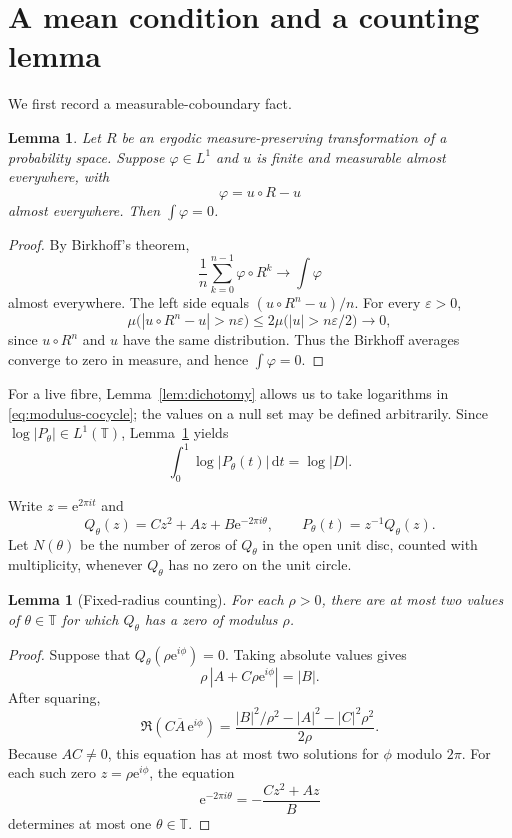 \documentclass[11pt]{amsart}
\newtheorem{lemma}[theorem]{Lemma}
\theoremstyle{remark}
\newcommand{\T}{\mathbb T}
\newcommand{\e}{\mathrm e}
\newcommand{\dd}{\,\mathrm d}
\begin{document}
\section{A mean condition and a counting lemma}

We first record a measurable-coboundary fact.

\begin{lemma}\label{lem:mean-zero}
Let $R$ be an ergodic measure-preserving transformation of a probability space. Suppose
$\varphi\in L^1$ and $u$ is finite and measurable almost everywhere, with
\[
 \varphi=u\circ R-u
\]
almost everywhere. Then $\int\varphi=0$.
\end{lemma}

\begin{proof}
By Birkhoff's theorem,
\[
 \frac1n\sum_{k=0}^{n-1}\varphi\circ R^k\longrightarrow\int\varphi
\]
almost everywhere. The left side equals $(u\circ R^n-u)/n$. For every
$\varepsilon>0$,
\[
 \mu\bigl(|u\circ R^n-u|>n\varepsilon\bigr)
 \le 2\mu\bigl(|u|>n\varepsilon/2\bigr)\longrightarrow0,
\]
since $u\circ R^n$ and $u$ have the same distribution. Thus the Birkhoff averages
converge to zero in measure, and hence $\int\varphi=0$.
\end{proof}

For a live fibre, Lemma~\ref{lem:dichotomy} allows us to take logarithms in
\eqref{eq:modulus-cocycle}; the values on a null set may be defined arbitrarily. Since
$\log|P_\theta|\in L^1(\T)$, Lemma~\ref{lem:mean-zero} yields
\begin{equation}\label{eq:mean-condition}
 \int_0^1\log|P_\theta(t)|\dd t=\log|D|.
\end{equation}

Write $z=\e^{2\pi i t}$ and
\begin{equation}\label{eq:Q}
 Q_\theta(z)=Cz^2+Az+B\e^{-2\pi i\theta},
 \qquad
 P_\theta(t)=z^{-1}Q_\theta(z).
\end{equation}
Let $N(\theta)$ be the number of zeros of $Q_\theta$ in the open unit disc, counted
with multiplicity, whenever $Q_\theta$ has no zero on the unit circle.

\begin{lemma}[Fixed-radius counting]\label{lem:counting}
For each $\rho>0$, there are at most two values of $\theta\in\T$ for which
$Q_\theta$ has a zero of modulus $\rho$.
\end{lemma}

\begin{proof}
Suppose that $Q_\theta(\rho\e^{i\phi})=0$. Taking absolute values gives
\[
 \rho\,|A+C\rho\e^{i\phi}|=|B|.
\]
After squaring,
\[
 \Re\!\left(C\overline A\,\e^{i\phi}\right)
 =\frac{|B|^2/\rho^2-|A|^2-|C|^2\rho^2}{2\rho}.
\]
Because $A C\ne0$, this equation has at most two solutions for $\phi$ modulo $2\pi$.
For each such zero $z=\rho\e^{i\phi}$, the equation
\[
 \e^{-2\pi i\theta}=-\frac{Cz^2+Az}{B}
\]
determines at most one $\theta\in\T$.
\end{proof}
\end{document}
